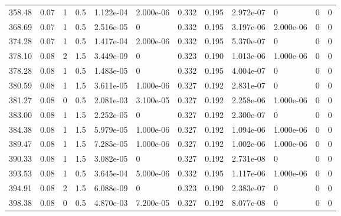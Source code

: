 \documentclass[preview]{standalone}
\begin{document}
{{{\begin{tabular}{L{1.2cm}C{1.2cm} C{0.3cm}C{0.5cm} C{1.4cm}C{1.4cm} C{1.4cm}C{1.4cm} C{1.6cm}C{1.6cm} C{1.6cm}C{1.6cm}}
  358.48  &  0.07  & 1     & 0.5 &  1.122e-04  & 2.000e-06  &  0.332&   0.195& 2.972e-07 & 0   &  0 & 0  \\ 
  368.69  &  0.07  & 1     & 0.5 &  2.516e-05  & 0  &  0.332&   0.195& 3.197e-06 & 2.000e-06   &  0 & 0  \\ 
  374.28  &  0.07  & 1     & 0.5 &  1.417e-04  & 2.000e-06  &  0.332&   0.195& 5.370e-07 & 0   &  0 & 0  \\ 
  378.10  &  0.08  & 2     & 1.5 &  3.449e-09  & 0  &  0.323&   0.190& 1.013e-06 & 1.000e-06   &  0 & 0  \\ 
  378.28  &  0.08  & 1     & 0.5 &  1.483e-05  & 0  &  0.332&   0.195& 4.004e-07 & 0   &  0 & 0  \\ 
  380.59  &  0.08  & 1     & 1.5 &  3.611e-05  & 1.000e-06  &  0.327&   0.192& 2.831e-07 & 0   &  0 & 0  \\ 
  381.27  &  0.08  & 0     & 0.5 &  2.081e-03  & 3.100e-05  &  0.327&   0.192& 2.258e-06 & 1.000e-06   &  0 & 0  \\ 
  383.00  &  0.08  & 1     & 1.5 &  2.252e-05  & 0  &  0.327&   0.192& 2.300e-07 & 0   &  0 & 0  \\ 
  384.38  &  0.08  & 1     & 1.5 &  5.979e-05  & 1.000e-06  &  0.327&   0.192& 1.094e-06 & 1.000e-06   &  0 & 0  \\ 
  389.47  &  0.08  & 1     & 1.5 &  7.285e-05  & 1.000e-06  &  0.327&   0.192& 1.002e-06 & 1.000e-06   &  0 & 0  \\ 
  390.33  &  0.08  & 1     & 1.5 &  3.082e-05  & 0  &  0.327&   0.192& 2.731e-08 & 0   &  0 & 0  \\ 
  393.53  &  0.08  & 1     & 0.5 &  3.645e-04  & 5.000e-06  &  0.332&   0.195& 1.117e-06 & 1.000e-06   &  0 & 0  \\ 
  394.91  &  0.08  & 2     & 1.5 &  6.088e-09  & 0  &  0.323&   0.190& 2.383e-07 & 0   &  0 & 0  \\ 
  398.38  &  0.08  & 0     & 0.5 &  4.870e-03  & 7.200e-05  &  0.327&   0.192& 8.077e-08 & 0   &  0 & 0  \\ 
\hline 
\end{tabular} 

}}}
\end{document}
